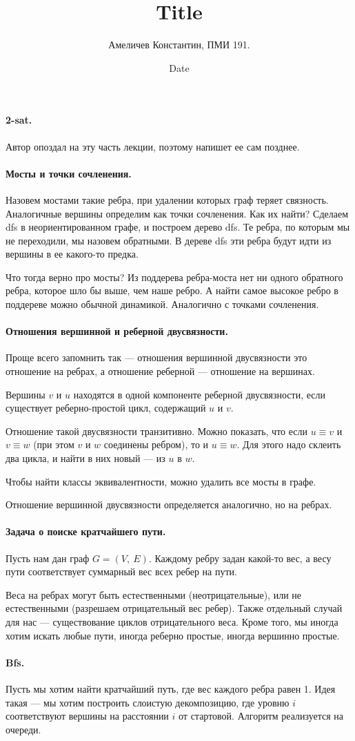 \documentclass[12pt]{article}
\title{Title}
\author{Амеличев Константин, ПМИ 191.}
\date{Date}
\begin{document}
\paragraph{2-sat.} Автор опоздал на эту часть лекции, поэтому напишет ее сам позднее.

\paragraph{Мосты и точки сочленения.} Назовем мостами такие ребра, при удалении которых граф теряет связность. Аналогичные вершины определим как точки сочленения. Как их найти? Сделаем dfs в неориентированном графе, и построем дерево dfs. Те ребра, по которым мы не переходили, мы назовем обратными. В дереве dfs эти ребра будут идти из вершины в ее какого-то предка.

Что тогда верно про мосты? Из поддерева ребра-моста нет ни одного обратного ребра, которое шло бы выше, чем наше ребро. А найти самое высокое ребро в поддереве можно обычной динамикой. Аналогично с точками сочленения. 

\paragraph{Отношения вершинной и реберной двусвязности.} Проще всего запомнить так --- отношения вершинной двусвязности это отношение на ребрах, а отношение реберной --- отношение на вершинах.

Вершины $v$ и $u$ находятся в одной компоненте реберной двусвязности, если существует реберно-простой цикл, содержащий $u$ и $v$.

Отношение такой двусвязности транзитивно. Можно показать, что если $u \equiv v$ и $v \equiv w$ (при этом $v$ и $w$ соединены ребром), то и $u \equiv w$. Для этого надо склеить два цикла, и найти в них новый --- из $u$ в $w$.

Чтобы найти классы эквивалентности, можно удалить все мосты в графе.

Отношение вершинной двусвязности определяется аналогично, но на ребрах.

\paragraph{Задача о поиске кратчайшего пути.}

Пусть нам дан граф $G = (V,\ E)$. Каждому ребру задан какой-то вес, а весу пути соответствует суммарный вес всех ребер на пути.

Веса на ребрах могут быть естественными (неотрицательные), или не естественными (разрешаем отрицательный вес ребер). Также отдельный случай для нас --- существование циклов отрицательного веса. Кроме того, мы иногда хотим искать любые пути, иногда реберно простые, иногда вершинно простые.

\paragraph{Bfs.} Пусть мы хотим найти кратчайший путь, где вес каждого ребра равен 1. Идея такая --- мы хотим построить слоистую декомпозицию, где уровню $i$ соответствуют вершины на расстоянии $i$ от стартовой. Алгоритм реализуется на очереди.
\end{document}
